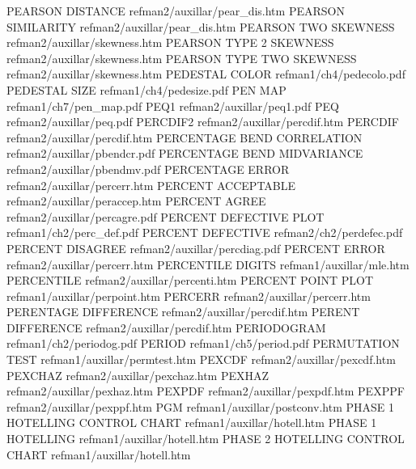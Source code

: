 PEARSON DISTANCE                        refman2/auxillar/pear_dis.htm
PEARSON SIMILARITY                      refman2/auxillar/pear_dis.htm
PEARSON TWO SKEWNESS                    refman2/auxillar/skewness.htm
PEARSON TYPE 2 SKEWNESS                 refman2/auxillar/skewness.htm
PEARSON TYPE TWO SKEWNESS               refman2/auxillar/skewness.htm
PEDESTAL COLOR                          refman1/ch4/pedecolo.pdf
PEDESTAL SIZE                           refman1/ch4/pedesize.pdf
PEN MAP                                 refman1/ch7/pen_map.pdf
PEQ1                                    refman2/auxillar/peq1.pdf
PEQ                                     refman2/auxillar/peq.pdf
PERCDIF2                                refman2/auxillar/percdif.htm
PERCDIF                                 refman2/auxillar/percdif.htm
PERCENTAGE BEND CORRELATION             refman2/auxillar/pbendcr.pdf
PERCENTAGE BEND MIDVARIANCE             refman2/auxillar/pbendmv.pdf
PERCENTAGE ERROR                        refman2/auxillar/percerr.htm
PERCENT ACCEPTABLE                      refman2/auxillar/peraccep.htm
PERCENT AGREE                           refman2/auxillar/percagre.pdf
PERCENT DEFECTIVE PLOT                  refman1/ch2/perc_def.pdf
PERCENT DEFECTIVE                       refman2/ch2/perdefec.pdf
PERCENT DISAGREE                        refman2/auxillar/percdiag.pdf
PERCENT ERROR                           refman2/auxillar/percerr.htm
PERCENTILE DIGITS                       refman1/auxillar/mle.htm
PERCENTILE                              refman2/auxillar/percenti.htm
PERCENT POINT PLOT                      refman1/auxillar/perpoint.htm
PERCERR                                 refman2/auxillar/percerr.htm
PERENTAGE DIFFERENCE                    refman2/auxillar/percdif.htm
PERENT DIFFERENCE                       refman2/auxillar/percdif.htm
PERIODOGRAM                             refman1/ch2/periodog.pdf
PERIOD                                  refman1/ch5/period.pdf
PERMUTATION TEST                        refman1/auxillar/permtest.htm
PEXCDF                                  refman2/auxillar/pexcdf.htm
PEXCHAZ                                 refman2/auxillar/pexchaz.htm
PEXHAZ                                  refman2/auxillar/pexhaz.htm
PEXPDF                                  refman2/auxillar/pexpdf.htm
PEXPPF                                  refman2/auxillar/pexppf.htm
PGM                                     refman1/auxillar/postconv.htm
PHASE 1 HOTELLING CONTROL CHART         refman1/auxillar/hotell.htm
PHASE 1 HOTELLING                       refman1/auxillar/hotell.htm
PHASE 2 HOTELLING CONTROL CHART         refman1/auxillar/hotell.htm
